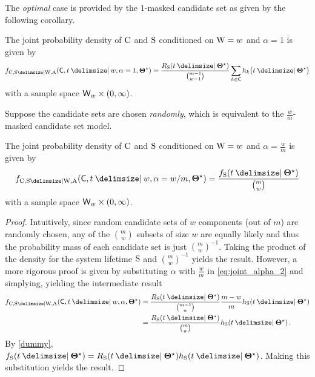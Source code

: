 \documentclass[
    11pt,
    extrafontsizes,
    article,
    oldfontcommands,
    final,
    oneside,
    openany,
    hidelinks]{memoir}
\begin{document}
The \emph{optimal} case is provided by the $1$-masked candidate set as given by the following corollary.
\begin{corollary}
	\label{thm:general_joint_likelihood_cand}
	The joint probability density of $\mathrm{C}$ and $\mathrm{S}$ conditioned on $\mathrm{W} = w$ and $\alpha=1$ is given by
	\begin{equation}
	\label{eq:general_joint_likelihood_cand}
	\pdf_{\rvcand, \sv \Given \RV{W}, \RV{A}}(\cand, t \Given w, \alpha=1,\tparam\sysparam) = \frac{\srv_{\sv}(t \Given \tparam\sysparam)}{\binom{m-1}{w-1}}	
	\sum_{k \in \cand} \haz_k\!\left(t \Given \tparam\sysparam\right)
	\end{equation}
	with a sample space $\candsw{w} \times (0,\infty)$.
\end{corollary}

Suppose the candidate sets are chosen \emph{randomly}, which is equivalent to the $\frac{w}{m}$-masked candidate set model.
\begin{corollary}
The joint probability density of $\mathrm{C}$ and $\mathrm{S}$ conditioned on $\mathrm{W} = w$ and $\alpha=\frac{w}{m}$ is given by
\begin{equation}
	\pdf_{\rvcand, \sv \Given \RV{W}, \RV{A}}(\cand, t \Given w, \alpha=w/m,\tparam\sysparam) = \frac{\spdf(t \Given \tparam\sysparam)}{\binom{m}{w}}	
\end{equation}
with a sample space $\candsw{w} \times (0,\infty)$.
\end{corollary}
\begin{proof}
Intuitively, since random candidate sets of $w$ components (out of $m$) are randomly chosen, any of the $\binom{m}{w}$ subsets of size $w$ are equally likely and thus the probability mass of each candidate set is just $\binom{m}{w}^{-1}$.
Taking the product of the density for the system lifetime $\mathrm{S}$ and $\binom{m}{w}^{-1}$ yields the result.
However, a more rigorous proof is given by substituting $\alpha$ with $\frac{w}{m}$ in \cref{eq:joint_alpha_2} and simplying, yielding the intermediate result
\begin{align}
\pdf_{\rvcand,\sv \Given \RV{W}, \RV{A}}(\cand,t \Given w, \alpha, \tparam\sysparam)
	&= \frac{\srv_{\sv}(t \Given \tparam\sysparam)}{\binom{m-1}{w}}
		\frac{m-w}{m} \haz_{\sv}(t \Given \tparam\sysparam)\\
	&= \frac{\srv_{\sv}(t \Given \tparam\sysparam)}{\binom{m}{w}}
	\haz_{\sv}(t \Given \tparam\sysparam)\,.
\end{align}
By \cref{dummy}, $\spdf(t \Given \tparam\sysparam) = \srv_{\sv}(t \Given \tparam\sysparam) \haz_{\sv}(t \Given \tparam\sysparam)$.
Making this substitution yields the result.
\end{proof}
\end{document}
